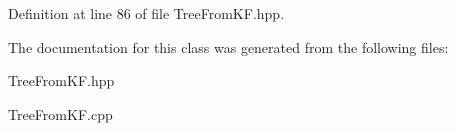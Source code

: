 Definition at line 86 of file Tree\-From\-K\-F.\-hpp.



The documentation for this class was generated from the following files\-:\begin{DoxyCompactItemize}
\item 
Tree\-From\-K\-F.\-hpp\item 
Tree\-From\-K\-F.\-cpp\end{DoxyCompactItemize}
